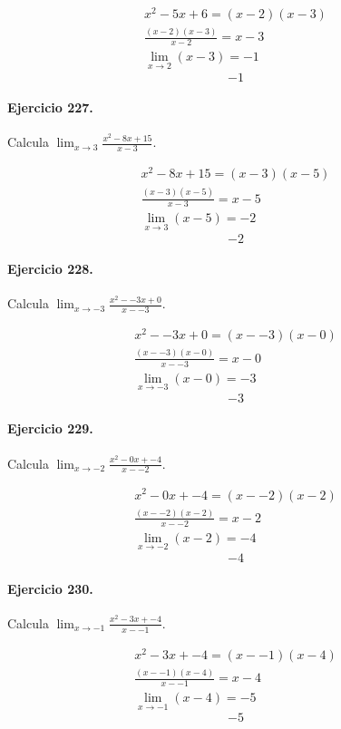 \documentclass[11pt,a4paper]{article}
\begin{document}
\[
\begin{aligned}
x^2-5x+6=(x-2)(x-3)\\
\frac{(x-2)(x-3)}{x-2}=x-3\\
\lim_{x\to 2}(x-3)=-1
\end{aligned}
\]
\[\boxed{-1}\]


\paragraph{Ejercicio 227.} Calcula $\displaystyle\lim_{x\to 3}\frac{x^2-8x+15}{x-3}$. 

\[
\begin{aligned}
x^2-8x+15=(x-3)(x-5)\\
\frac{(x-3)(x-5)}{x-3}=x-5\\
\lim_{x\to 3}(x-5)=-2
\end{aligned}
\]
\[\boxed{-2}\]


\paragraph{Ejercicio 228.} Calcula $\displaystyle\lim_{x\to -3}\frac{x^2--3x+0}{x--3}$. 

\[
\begin{aligned}
x^2--3x+0=(x--3)(x-0)\\
\frac{(x--3)(x-0)}{x--3}=x-0\\
\lim_{x\to -3}(x-0)=-3
\end{aligned}
\]
\[\boxed{-3}\]


\paragraph{Ejercicio 229.} Calcula $\displaystyle\lim_{x\to -2}\frac{x^2-0x+-4}{x--2}$. 

\[
\begin{aligned}
x^2-0x+-4=(x--2)(x-2)\\
\frac{(x--2)(x-2)}{x--2}=x-2\\
\lim_{x\to -2}(x-2)=-4
\end{aligned}
\]
\[\boxed{-4}\]


\paragraph{Ejercicio 230.} Calcula $\displaystyle\lim_{x\to -1}\frac{x^2-3x+-4}{x--1}$. 

\[
\begin{aligned}
x^2-3x+-4=(x--1)(x-4)\\
\frac{(x--1)(x-4)}{x--1}=x-4\\
\lim_{x\to -1}(x-4)=-5
\end{aligned}
\]
\[\boxed{-5}\]
\end{document}
